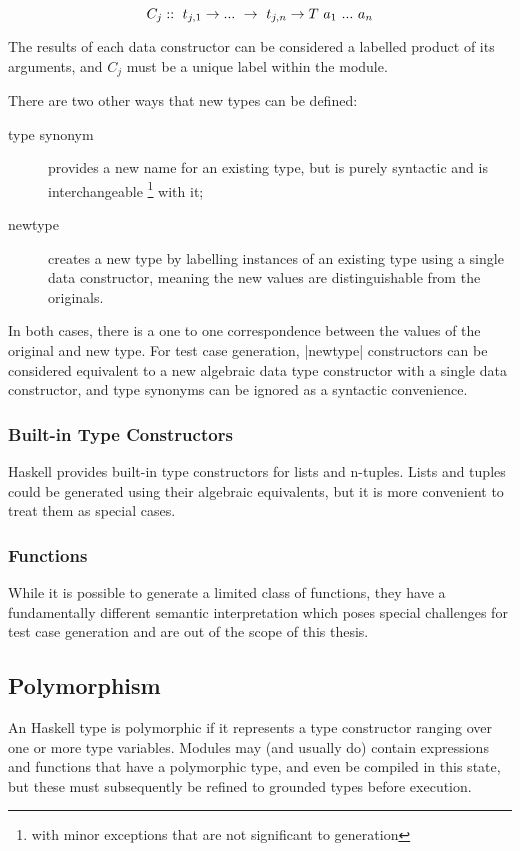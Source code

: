 \begin{equation*}
C_j :: \ t_{j,1} \rightarrow ...\ \rightarrow\ t_{j,n} \rightarrow T\ a_1\ ...\ a_n
\end{equation*}

\noindent
The results of each data constructor can be considered a labelled product of its arguments,
and $C_j$ must be a unique label within the module.

\noindent
There are two other ways that new types can be defined:
\begin{description}
\item[type synonym] provides a new name for an existing type,
but is purely syntactic and is interchangeable%
\footnote{with minor exceptions that are not significant to generation} with it;
\item [newtype] creates a new type by labelling instances of an existing type
using a single data constructor,
meaning the new values are distinguishable from the originals.
\end{description}
\noindent
In both cases, there is a one to one correspondence between the values of the original and new type.
For test case generation,
|newtype| constructors can be considered equivalent to
a new algebraic data type constructor with a single data constructor,
and type synonyms can be ignored as a syntactic convenience.

\subsubsection{Built-in Type Constructors}
Haskell provides built-in type constructors for lists and n-tuples.
Lists and tuples could be generated using
their algebraic equivalents,
but it is more convenient to treat them as special cases.

\subsubsection{Functions}
While it is possible to generate a limited class of functions,
they have a fundamentally different semantic interpretation
which poses special challenges for test case generation
and are out of the scope of this thesis.

\subsection{Polymorphism}

An Haskell type is polymorphic if
it represents a type constructor ranging over one or more type variables.
Modules may (and usually do) contain expressions and functions that have a polymorphic type,
and even be compiled in this state,
but these must subsequently be refined to grounded types before execution.

